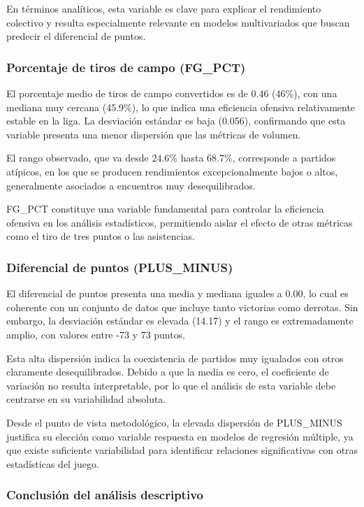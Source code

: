 \documentclass[12pt]{article}
\begin{document}
En términos analíticos, esta variable es clave para explicar el rendimiento colectivo y resulta
especialmente relevante en modelos multivariados que buscan predecir el diferencial de puntos.

\subsubsection*{Porcentaje de tiros de campo (FG\_PCT)}

El porcentaje medio de tiros de campo convertidos es de 0.46 (46\%), con una mediana muy cercana
(45.9\%), lo que indica una eficiencia ofensiva relativamente estable en la liga. La desviación
estándar es baja (0.056), confirmando que esta variable presenta una menor dispersión que las
métricas de volumen.

El rango observado, que va desde 24.6\% hasta 68.7\%, corresponde a partidos atípicos, en los
que se producen rendimientos excepcionalmente bajos o altos, generalmente asociados a
encuentros muy desequilibrados.

FG\_PCT constituye una variable fundamental para controlar la eficiencia ofensiva en los análisis
estadísticos, permitiendo aislar el efecto de otras métricas como el tiro de tres puntos o las
asistencias.

\subsubsection*{Diferencial de puntos (PLUS\_MINUS)}

El diferencial de puntos presenta una media y mediana iguales a 0.00, lo cual es coherente con un
conjunto de datos que incluye tanto victorias como derrotas. Sin embargo, la desviación estándar
es elevada (14.17) y el rango es extremadamente amplio, con valores entre -73 y 73 puntos.

Esta alta dispersión indica la coexistencia de partidos muy igualados con otros claramente
desequilibrados. Debido a que la media es cero, el coeficiente de variación no resulta interpretable,
por lo que el análisis de esta variable debe centrarse en su variabilidad absoluta.

Desde el punto de vista metodológico, la elevada dispersión de PLUS\_MINUS justifica su elección
como variable respuesta en modelos de regresión múltiple, ya que existe suficiente variabilidad
para identificar relaciones significativas con otras estadísticas del juego.

\subsubsection*{Conclusión del análisis descriptivo}
\end{document}
